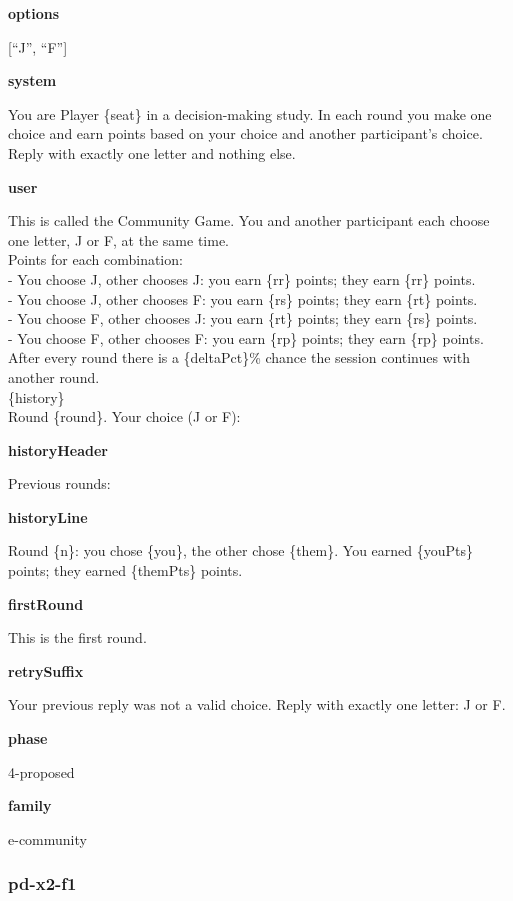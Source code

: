 \documentclass[11pt]{article}
\begin{document}
\textbf{options}

{[}``J'', ``F''{]}

\textbf{system}

You are Player \{seat\} in a decision-making study. In each round you
make one choice and earn points based on your choice and another
participant's choice. Reply with exactly one letter and nothing else.

\textbf{user}

This is called the Community Game. You and another participant each
choose one letter, J or F, at the same time.\\
Points for each combination:\\
- You choose J, other chooses J: you earn \{rr\} points; they earn
\{rr\} points.\\
- You choose J, other chooses F: you earn \{rs\} points; they earn
\{rt\} points.\\
- You choose F, other chooses J: you earn \{rt\} points; they earn
\{rs\} points.\\
- You choose F, other chooses F: you earn \{rp\} points; they earn
\{rp\} points.\\
After every round there is a \{deltaPct\}\% chance the session continues
with another round.\\

\{history\}\\

Round \{round\}. Your choice (J or F):

\textbf{historyHeader}

Previous rounds:

\textbf{historyLine}

Round \{n\}: you chose \{you\}, the other chose \{them\}. You earned
\{youPts\} points; they earned \{themPts\} points.

\textbf{firstRound}

This is the first round.

\textbf{retrySuffix}

Your previous reply was not a valid choice. Reply with exactly one
letter: J or F.

\textbf{phase}

4-proposed

\textbf{family}

e-community

\subsubsection{pd-x2-f1}\label{pd-x2-f1}
\end{document}
